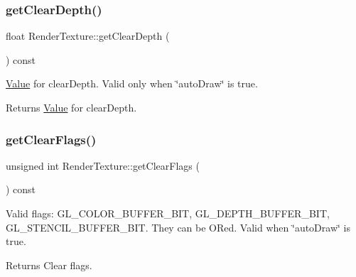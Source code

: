 \subsubsection{\texorpdfstring{get\+Clear\+Depth()}{getClearDepth()}\hspace{0.1cm}{\footnotesize\ttfamily [2/2]}}
{\footnotesize\ttfamily float Render\+Texture\+::get\+Clear\+Depth (\begin{DoxyParamCaption}{ }\end{DoxyParamCaption}) const\hspace{0.3cm}{\ttfamily [inline]}}

\hyperlink{classValue}{Value} for clear\+Depth. Valid only when \char`\"{}auto\+Draw\char`\"{} is true.

\begin{DoxyReturn}{Returns}
\hyperlink{classValue}{Value} for clear\+Depth. 
\end{DoxyReturn}
\mbox{\label{classRenderTexture_ab20bf288dc1db1f0a21b0a0689a8e2aa}} 
\subsubsection{\texorpdfstring{get\+Clear\+Flags()}{getClearFlags()}\hspace{0.1cm}{\footnotesize\ttfamily [1/2]}}
{\footnotesize\ttfamily unsigned int Render\+Texture\+::get\+Clear\+Flags (\begin{DoxyParamCaption}{ }\end{DoxyParamCaption}) const\hspace{0.3cm}{\ttfamily [inline]}}

Valid flags\+: G\+L\+\_\+\+C\+O\+L\+O\+R\+\_\+\+B\+U\+F\+F\+E\+R\+\_\+\+B\+IT, G\+L\+\_\+\+D\+E\+P\+T\+H\+\_\+\+B\+U\+F\+F\+E\+R\+\_\+\+B\+IT, G\+L\+\_\+\+S\+T\+E\+N\+C\+I\+L\+\_\+\+B\+U\+F\+F\+E\+R\+\_\+\+B\+IT. They can be OR\textquotesingle{}ed. Valid when \char`\"{}auto\+Draw\char`\"{} is true.

\begin{DoxyReturn}{Returns}
Clear flags. 
\end{DoxyReturn}
\mbox{\label{classRenderTexture_ab20bf288dc1db1f0a21b0a0689a8e2aa}} 
